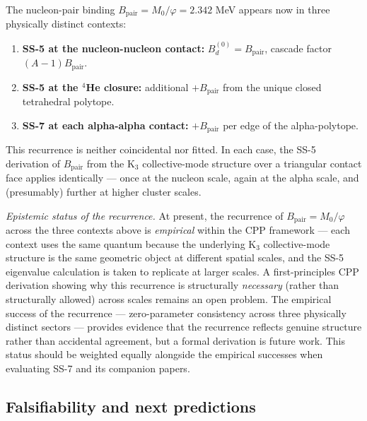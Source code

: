 \documentclass[11pt,letterpaper]{article}
\newcommand{\phig}{\varphi}
\newcommand{\Mzero}{M_0}
\newcommand{\Bpair}{B_{\mathrm{pair}}}
\begin{document}
The nucleon-pair binding $\Bpair = \Mzero/\phig = 2.342$ MeV appears now in three physically distinct contexts:
\begin{enumerate}
\item \textbf{SS-5 at the nucleon-nucleon contact:} $B_d^{(0)} = \Bpair$, cascade factor $(A-1)\Bpair$.
\item \textbf{SS-5 at the ${}^4$He closure:} additional $+\Bpair$ from the unique closed tetrahedral polytope.
\item \textbf{SS-7 at each alpha-alpha contact:} $+\Bpair$ per edge of the alpha-polytope.
\end{enumerate}
This recurrence is neither coincidental nor fitted. In each case, the SS-5 derivation of $\Bpair$ from the K$_3$ collective-mode structure over a triangular contact face applies identically --- once at the nucleon scale, again at the alpha scale, and (presumably) further at higher cluster scales.

\emph{Epistemic status of the recurrence.} At present, the recurrence of $\Bpair = \Mzero/\phig$ across the three contexts above is \emph{empirical} within the CPP framework --- each context uses the same quantum because the underlying K$_3$ collective-mode structure is the same geometric object at different spatial scales, and the SS-5 eigenvalue calculation is taken to replicate at larger scales. A first-principles CPP derivation showing why this recurrence is structurally \emph{necessary} (rather than structurally allowed) across scales remains an open problem. The empirical success of the recurrence --- zero-parameter consistency across three physically distinct sectors --- provides evidence that the recurrence reflects genuine structure rather than accidental agreement, but a formal derivation is future work. This status should be weighted equally alongside the empirical successes when evaluating SS-7 and its companion papers.

\subsection{Falsifiability and next predictions}
\end{document}
